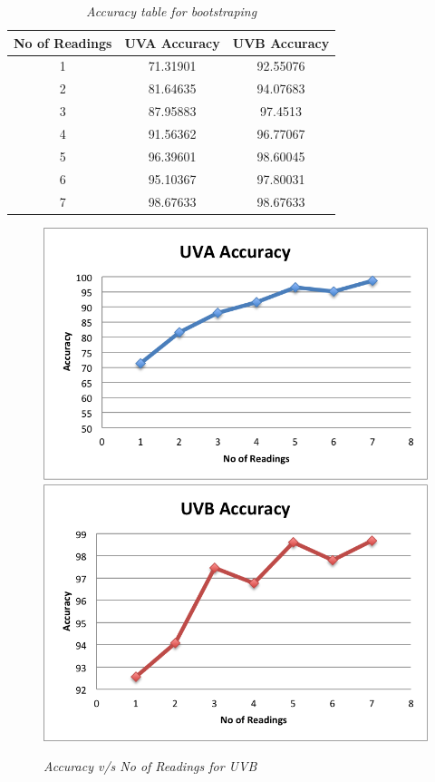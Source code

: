 \documentclass[12pt,fullpage,doublespace]{article}
\begin{document}
\newpage
\begin{table}
\centering
\begin{tabular}{|c|c|c|}
\hline
No of Readings & UVA Accuracy & UVB Accuracy \\
\hline 
1 & 71.31901 & 92.55076\\
\hline
2 & 81.64635 & 94.07683\\
\hline
3 & 87.95883 & 97.4513\\
\hline
4 & 91.56362 & 96.77067\\
\hline
5 & 96.39601 & 98.60045\\
\hline
6 & 95.10367 & 97.80031\\
\hline
7 & 98.67633 & 98.67633\\
\hline
\end{tabular}
\caption{\small \sl Accuracy table for bootstraping}
\end{table}


\begin{figure}
\begin{center}
\includegraphics[scale=0.5]{segment6uva.png}
\includegraphics[scale=0.5]{segment6uvb.png}
\caption{\small \sl Accuracy v/s No of Readings for UVB}
\label{fig:lessReadings}
\end{center}
\end{figure}
\end{document}
